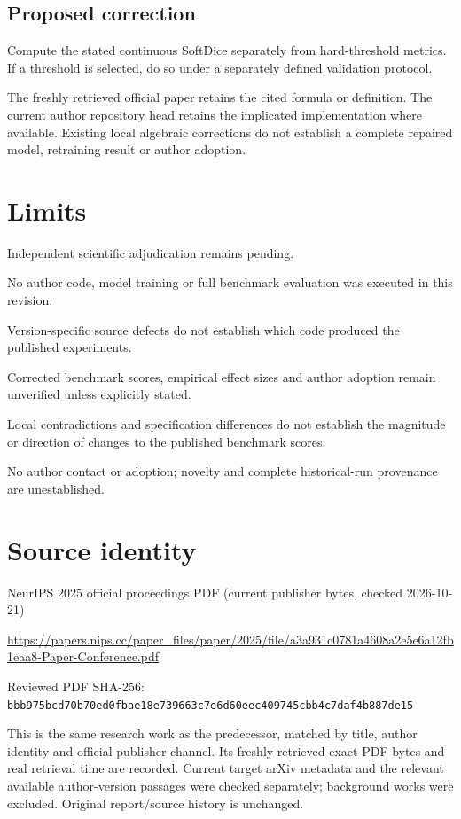 \documentclass[11pt]{article}
\begin{document}
\subsection*{Proposed correction}

Compute the stated continuous SoftDice separately from hard-threshold metrics. If a threshold is selected, do so under a separately defined validation protocol.

The freshly retrieved official paper retains the cited formula or definition. The current author repository head retains the implicated implementation where available. Existing local algebraic corrections do not establish a complete repaired model, retraining result or author adoption.

\section*{Limits}

Independent scientific adjudication remains pending.\par

No author code, model training or full benchmark evaluation was executed in this revision.\par

Version-specific source defects do not establish which code produced the published experiments.\par

Corrected benchmark scores, empirical effect sizes and author adoption remain unverified unless explicitly stated.\par

Local contradictions and specification differences do not establish the magnitude or direction of changes to the published benchmark scores.\par

No author contact or adoption; novelty and complete historical-run provenance are unestablished.\par

\section*{Source identity}

NeurIPS 2025 official proceedings PDF (current publisher bytes, checked 2026-10-21)

\url{https://papers.nips.cc/paper_files/paper/2025/file/a3a931c0781a4608a2e5e6a12fb1eaa8-Paper-Conference.pdf}

Reviewed PDF SHA-256: \nolinkurl{bbb975bcd70b70ed0fbae18e739663c7e6d60eec409745cbb4c7daf4b887de15}

This is the same research work as the predecessor, matched by title, author identity and official publisher channel. Its freshly retrieved exact PDF bytes and real retrieval time are recorded. Current target arXiv metadata and the relevant available author-version passages were checked separately; background works were excluded. Original report/source history is unchanged.
\end{document}

